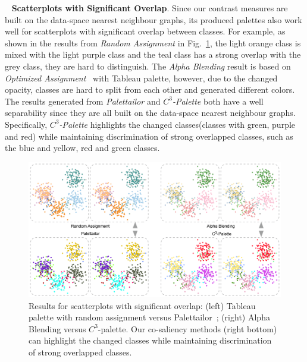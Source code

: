 \documentclass[review,onecolumn]{vgtc}                %
\newcommand{\myparagraph}[1]{\mbox{\ } \newline \noindent \textbf{#1}}
\renewcommand{\paragraph}[1]{\myparagraph{#1}}
\begin{document}
\paragraph{Scatterplots with Significant Overlap}.
Since our contrast measures are built on the data-space nearest neighbour graphs, its produced palettes also work well for scatterplots with significant overlap between classes. For example, as shown in the results from \emph{Random Assignment} in Fig.~\ref{fig:scatterOverlap}, the light orange class is mixed with the light purple class and the teal class has a strong overlap with the grey class, they are hard to distinguish. The \emph{Alpha Blending} result is based on \emph{Optimized Assignment}~\cite{Wang2018} with Tableau palette, however, due to the changed opacity, classes are hard to split from each other and generated different colors. The results generated from \emph{Palettailor} and \emph{$C^3$-Palette} both have a well separability since they are all built on the data-space nearest neighbour graphs. Specifically, \emph{$C^3$-Palette} highlights the changed classes(classes with green, purple and red) while maintaining discrimination of strong overlapped classes, such as the blue and yellow, red and green classes.

\begin{figure}[h]
\centering
\includegraphics[width=1\linewidth]{scatter-overlap.pdf}
\caption{Results for scatterplots with significant overlap: (left) Tableau palette with random assignment versus Palettailor~\cite{Lu21}; (right) Alpha Blending versus $C^3$-palette. Our co-saliency methods (right bottom) can highlight the changed classes while maintaining discrimination of strong overlapped classes.
}
\vspace*{-3mm}
\label{fig:scatterOverlap}
\end{figure}
\end{document}
